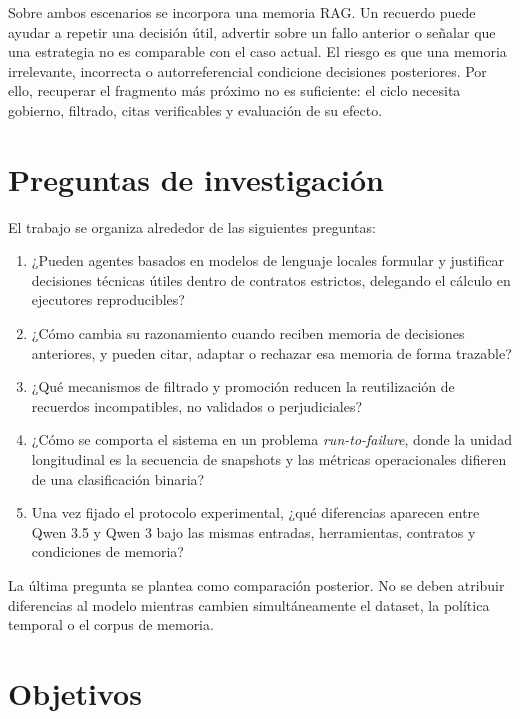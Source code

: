 Sobre ambos escenarios se incorpora una memoria RAG\@. Un recuerdo puede ayudar a
repetir una decisión útil, advertir sobre un fallo anterior o señalar que una
estrategia no es comparable con el caso actual. El riesgo es que una memoria
irrelevante, incorrecta o autorreferencial condicione decisiones posteriores.
Por ello, recuperar el fragmento más próximo no es suficiente: el ciclo necesita
gobierno, filtrado, citas verificables y evaluación de su efecto.

\section{Preguntas de investigación}

El trabajo se organiza alrededor de las siguientes preguntas:

\begin{enumerate}[label=\textbf{PI\arabic*:}]
  \item ¿Pueden agentes basados en modelos de lenguaje locales formular y
        justificar decisiones técnicas útiles dentro de contratos estrictos,
        delegando el cálculo en ejecutores reproducibles?
  \item ¿Cómo cambia su razonamiento cuando reciben memoria de decisiones
        anteriores, y pueden citar, adaptar o rechazar esa memoria de forma
        trazable?
  \item ¿Qué mecanismos de filtrado y promoción reducen la reutilización de
        recuerdos incompatibles, no validados o perjudiciales?
  \item ¿Cómo se comporta el sistema en un problema \textit{run-to-failure},
        donde la unidad longitudinal es la secuencia de snapshots y las
        métricas operacionales difieren de una clasificación binaria?
  \item Una vez fijado el protocolo experimental, ¿qué diferencias aparecen
        entre Qwen 3.5 y Qwen 3 bajo las mismas entradas, herramientas,
        contratos y condiciones de memoria?
\end{enumerate}

La última pregunta se plantea como comparación posterior. No se deben atribuir
diferencias al modelo mientras cambien simultáneamente el dataset, la política
temporal o el corpus de memoria.

\section{Objetivos}

